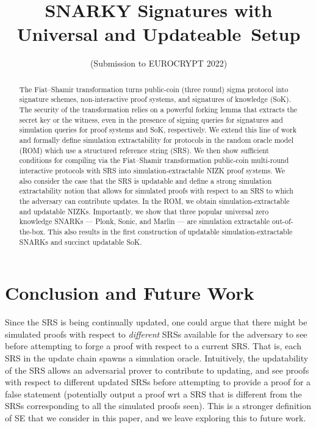\documentclass[10pt]{llncs}
\title{SNARKY Signatures with Universal and Updateable~Setup}
\author{(Submission to EUROCRYPT 2022)}
\institute{}
\begin{document}
 \sloppy
\maketitle

\begin{abstract}
The Fiat--Shamir transformation turns public-coin (three round) sigma protocol into signature schemes, non-interactive proof systems, and signatures of knowledge (SoK).  The security of the transformation relies on a powerful forking lemma that extracts the secret key or the witness, even in the presence of signing queries for signatures and simulation queries for proof systems and SoK, respectively.
We extend this line of work and formally define simulation extractability for protocols in the random oracle model (ROM) which use a structured reference string (SRS). We then show sufficient conditions for compiling via the Fiat--Shamir transformation public-coin multi-round interactive protocols with SRS into simulation-extractable NIZK proof systems. We also consider the case that the SRS is updatable and define a strong simulation extractability notion that allows for simulated proofs with respect to an SRS to which the adversary can contribute updates.
In the ROM, we obtain simulation-extractable and updatable NIZKs. Importantly, we show that three popular universal zero knowledge SNARKs --- Plonk, Sonic, and Marlin --- are simulation extractable out-of-the-box. This also results in the first construction of updatable simulation-extractable SNARKs and succinct updatable SoK.
\end{abstract}

\ifupdate
%



%




\section{Conclusion and Future Work}

Since the SRS is being continually updated, one could argue that there might be simulated proofs with respect to \textit{different} SRSs available for the adversary to see before attempting to forge a proof with respect to a current SRS.
That is, each SRS in the update chain spawns a simulation oracle. Intuitively, the updatability of the SRS allows an adversarial prover to contribute to updating, and see proofs with respect to different updated SRSs before attempting to provide a proof for a false statement (potentially output a proof wrt a SRS that is different from the SRSs corresponding to all the simulated proofs seen).
This is a stronger definition of SE that we consider in this paper, and we leave exploring this to future work.
\end{document}
